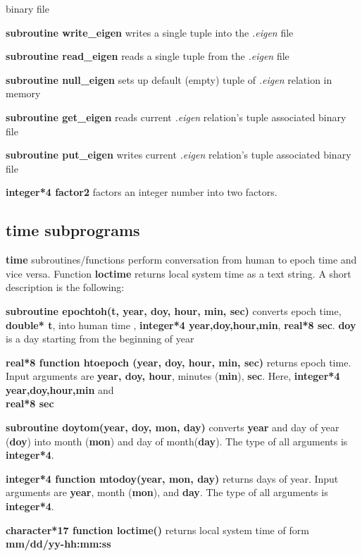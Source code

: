 \begin{description}
binary file
\item{\bf subroutine write\_eigen}  writes a single tuple into the 
{\it .eigen} file
\item{\bf subroutine read\_eigen}  reads a single tuple from the 
{\it .eigen} file
\item{\bf subroutine null\_eigen}  sets up default (empty) tuple of 
{\it .eigen} relation in memory
\item{\bf subroutine get\_eigen}  reads current 
{\it .eigen} relation's tuple associated binary file
\item{\bf subroutine put\_eigen}  writes current 
{\it .eigen} relation's tuple associated binary file
\item{\bf integer*4 factor2}  factors an integer number into two factors.
\end{description}
%
%
\subsection {time subprograms}
{\bf time} subroutines/functions perform conversation from human to epoch 
time and vice versa. Function {\bf loctime} returns local system time as 
a text string. A short description is the following:
\begin{description}
\item{\bf subroutine epochtoh(t, year, doy, hour, min, sec)}  converts epoch 
time, {\bf double* t}, into human time , {\bf integer*4 year,doy,hour,min}, 
{\bf real*8 sec}. {\bf doy} is a day starting from the beginning of year
\item{\bf real*8 function  htoepoch (year, doy, hour, min, sec)}  returns 
epoch time. Input arguments are {\bf year, doy, hour}, minutes ({\bf min}), 
{\bf sec}. Here, {\bf integer*4 year,doy,hour,min} and \\
{\bf real*8 sec}
\item{\bf subroutine doytom(year, doy, mon, day)} converts {\bf year}
and  day of year ({\bf doy}) into month ({\bf mon}) and day of 
month({\bf day}). The type of all arguments is {\bf  integer*4}.
\item{\bf integer*4 function mtodoy(year, mon, day)} returns days of year. 
Input arguments are {\bf year}, month ({\bf mon}), and {\bf day}. 
The type of all arguments is {\bf integer*4}.
\item{\bf character*17 function loctime()} returns local system time of form
{\bf mm/dd/yy-hh:mm:ss}
\end{description}
